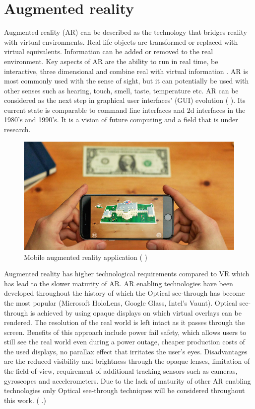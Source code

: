 \documentclass[12pt, a4paper,oneside, nocenter]{thesis}
\renewcommand{\citep}[1]{(\citeauthor{#1} \citeyear{#1}.)}
\renewcommand{\citeyearpar}[1]{(\citeauthor{#1} \citeyear{#1})}
\begin{document}
\section{Augmented reality}%
Augmented reality (AR) can be described as the technology that bridges reality with virtual environments. Real life objects are transformed or replaced with virtual equivalents. Information can be added or removed to the real environment. Key aspects of AR are the ability to run in real time, be interactive, three dimensional and combine real with virtual information . AR is most commonly used with the sense of sight, but it can potentially be used with other senses such as hearing, touch, smell, taste, temperature etc. AR can be considered as the next step in graphical user interfaces' (GUI) evolution \citeyearpar{prototyping-ar}. Its current state is comparable to command line interfaces and 2d interfaces in the 1980's and 1990's. It is a vision of future computing and a field that is under research.
\begin{figure}[H]
	\includegraphics[width=\textwidth]{ar-application}
	\caption{Mobile augmented reality application \citeyearpar{ar-application-whitehouse}}
	\label{fig:ar-application}
\end{figure}
\par
Augmented reality has higher technological requirements compared to VR which has lead to the slower maturity of AR. AR enabling technologies have been developed throughout the history of which the Optical see-through has become the most popular (Microsoft HoloLens, Google Glass, Intel's Vaunt). Optical see-through is achieved by using opaque displays on which virtual overlays can be rendered. The resolution of the real world is left intact as it passes through the screen. Benefits of this approach include power fail safety, which allows users to still see the real world even during a power outage, cheaper production costs of the used displays, no parallax effect that irritates the user's eyes. Disadvantages are the reduced visibility and brightness through the opaque lenses, limitation of the field-of-view, requirement of additional tracking sensors such as cameras, gyroscopes and accelerometers. Due to the lack of maturity of other AR enabling technologies only Optical see-through techniques will be considered throughout this work. \citep{vrjournal}
\end{document}
